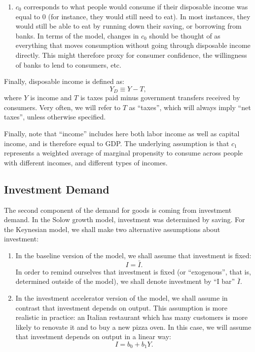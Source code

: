\documentclass[]{book}
\providecommand{\tightlist}{%
  \setlength{\itemsep}{0pt}\setlength{\parskip}{0pt}}
\theoremstyle{definition}
\theoremstyle{definition}
\theoremstyle{definition}
\theoremstyle{remark}
\begin{document}
\begin{enumerate}
\def\labelenumi{\arabic{enumi}.}
\setcounter{enumi}{1}
\tightlist
\item
  \(c_0\) corresponds to what people would consume if their disposable
  income was equal to \(0\) (for instance, they would still need to
  eat). In most instances, they would still be able to eat by running
  down their saving, or borrowing from banks. In terms of the model,
  changes in \(c_0\) should be thought of as everything that moves
  consumption without going through disposable income directly. This
  might therefore proxy for consumer confidence, the willingness of
  banks to lend to consumers, etc.
\end{enumerate}

Finally, disposable income is defined as: \[Y_D \equiv Y - T,\] where
\(Y\) is income and \(T\) is taxes paid minus government transfers
received by consumers. Very often, we will refer to \(T\) as ``taxes'',
which will always imply ``net taxes'', unless otherwise specified.

Finally, note that ``income'' includes here both labor income as well as
capital income, and is therefore equal to GDP. The underlying assumption
is that \(c_1\) represents a weighted average of marginal propensity to
consume across people with different incomes, and different types of
incomes.

\subsection{Investment Demand}\label{investment-demand}

The second component of the demand for goods is coming from investment
demand. In the Solow growth model, investment was determined by saving.
For the Keynesian model, we shall make two alternative assumptions about
investment:

\begin{enumerate}
\def\labelenumi{\arabic{enumi}.}
\item
  In the baseline version of the model, we shall assume that investment
  is fixed: \[I=\bar{I}.\] In order to remind ourselves that investment
  is fixed (or ``exogenous'', that is, determined outside of the model),
  we shall denote investment by ``I bar'' \(\bar{I}\).
\item
  In the investment accelerator version of the model, we shall assume in
  contrast that investment depends on output. This assumption is more
  realistic in practice: an Italian restaurant which has many customers
  is more likely to renovate it and to buy a new pizza oven. In this
  case, we will assume that investment depends on output in a linear
  way: \[I=b_0+b_1 Y.\]
\end{enumerate}
\end{document}
